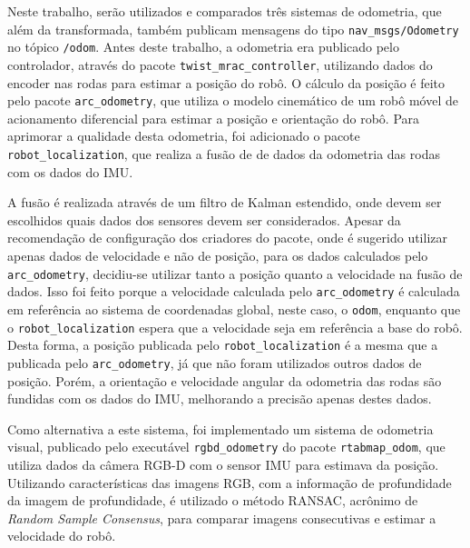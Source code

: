 \documentclass[repeatfields,xlists,xpacks,oneside,yearsonly]{ufrgscca}
\begin{document}
Neste trabalho, serão utilizados e comparados três sistemas de
odometria, que além da transformada, também publicam mensagens do
tipo \texttt{nav\_msgs/Odometry} no tópico \texttt{/odom}. Antes
deste trabalho, a odometria era publicado pelo controlador, através
do pacote \texttt{twist\_mrac\_controller}, utilizando dados do
encoder nas rodas para estimar a posição do robô. O cálculo da
posição é feito pelo pacote \texttt{arc\_odometry}, que utiliza o
modelo cinemático de um robô móvel de acionamento diferencial para
estimar a posição e orientação do robô. Para aprimorar a qualidade
desta odometria, foi adicionado o pacote
\texttt{robot\_localization}, que realiza a fusão de de dados da
odometria das rodas com os dados do IMU.

A fusão é realizada através de um filtro de Kalman estendido, onde
devem ser escolhidos quais dados dos sensores devem ser considerados.
Apesar da recomendação de configuração dos criadores do pacote, onde
é sugerido utilizar apenas dados de velocidade e não de posição, para
os dados calculados pelo \texttt{arc\_odometry}, decidiu-se utilizar
tanto a posição quanto a velocidade na fusão de dados. Isso foi feito
porque a velocidade calculada pelo \texttt{arc\_odometry} é calculada
em referência ao sistema de coordenadas global, neste caso, o
\texttt{odom}, enquanto que o \texttt{robot\_localization} espera que
a velocidade seja em referência a base do robô. Desta forma, a
posição publicada pelo \texttt{robot\_localization} é a mesma que a
publicada pelo \texttt{arc\_odometry}, já que não foram utilizados
outros dados de posição. Porém, a orientação e velocidade angular da
odometria das rodas são fundidas com os dados do IMU, melhorando a
precisão apenas destes dados.

Como alternativa a este sistema, foi implementado um sistema de
odometria visual, publicado pelo executável \texttt{rgbd\_odometry}
do pacote \texttt{rtabmap\_odom}, que utiliza dados da câmera RGB-D
com o sensor IMU para estimava da posição. Utilizando  características das imagens RGB,
com a informação de profundidade da imagem de profundidade, é
utilizado o método RANSAC, acrônimo de \textit{Random Sample
    Consensus}, para comparar imagens consecutivas e estimar a velocidade
do robô. 
\end{document}
